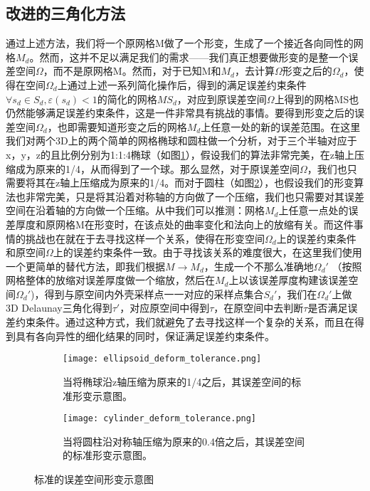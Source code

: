 \subsection{改进的三角化方法}
通过上述方法，我们将一个原网格M做了一个形变，生成了一个接近各向同性的网格$M_d$。然而，这并不足以满足我们的需求——我们真正想要做形变的是整一个误差空间$\Omega$，而不是原网格M。然而，对于已知M和$M_d$，去计算$\Omega$形变之后的$\Omega_d$，使得在空间$\Omega_d$上通过上述一系列简化操作后，得到的满足误差约束条件$\forall s_d \in S_d, \varepsilon(s_d)<1$的简化的网格$MS_d$，对应到原误差空间$\Omega$上得到的网格MS也仍然能够满足误差约束条件，这是一件非常具有挑战的事情。要得到形变之后的误差空间$\Omega_d$，也即需要知道形变之后的网格$M_d$上任意一处的新的误差范围。在这里我们对两个3D上的两个简单的网格椭球和圆柱做一个分析，对于三个半轴对应于x，y，z的且比例分别为1:1:4椭球（如图\ref{fig:ellipsoid-deform-tol}），假设我们的算法非常完美，在z轴上压缩成为原来的1/4，从而得到了一个球。那么显然，对于原误差空间$\Omega$，我们也只需要将其在z轴上压缩成为原来的1/4。而对于圆柱（如图\ref{fig:cylinder-deform-tol}），也假设我们的形变算法也非常完美，只是将其沿着对称轴的方向做了一个压缩，我们也只需要对其误差空间在沿着轴的方向做一个压缩。从中我们可以推测：网格$M_d$上任意一点处的误差厚度和原网格M在形变时，在该点处的曲率变化和法向上的放缩有关。而这件事情的挑战也在就在于去寻找这样一个关系，使得在形变空间$\Omega_d$上的误差约束条件和原空间$\Omega$上的误差约束条件一致。由于寻找该关系的难度很大，在这里我们使用一个更简单的替代方法，即我们根据$M \to M_d$，生成一个不那么准确地$\Omega_d'$ （按照网格整体的放缩对误差厚度做一个缩放，然后在$M_d$上以该误差厚度构建该误差空间$\Omega_d'$)，得到与原空间内外壳采样点一一对应的采样点集合$S_d′$，我们在$\Omega_d'$上做3D Delaunay三角化得到$\tau′$，对应原空间中得到$\tau$，在原空间中去判断$\tau$是否满足误差约束条件。通过这种方式，我们就避免了去寻找这样一个复杂的关系，而且在得到具有各向异性的细化结果的同时，保证满足误差约束条件。

\begin{figure}[H]
  \centering
  \begin{subfigure}[b]{0.8\textwidth}
    \texttt{[image: ellipsoid\_deform\_tolerance.png]}
    \caption{当将椭球沿z轴压缩为原来的1/4之后，其误差空间的标准形变示意图。}
    \label{fig:ellipsoid-deform-tol}
  \end{subfigure}
  \begin{subfigure}[b]{0.8\textwidth}
      \texttt{[image: cylinder\_deform\_tolerance.png]}
      \caption{当将圆柱沿对称轴压缩为原来的0.4倍之后，其误差空间的标准形变示意图。}
    \label{fig:cylinder-deform-tol}
  \end{subfigure}
  \caption[标准的误差空间形变示意图]{标准的误差空间形变示意图}
  \label{fig:deform-tol}
\end{figure}

